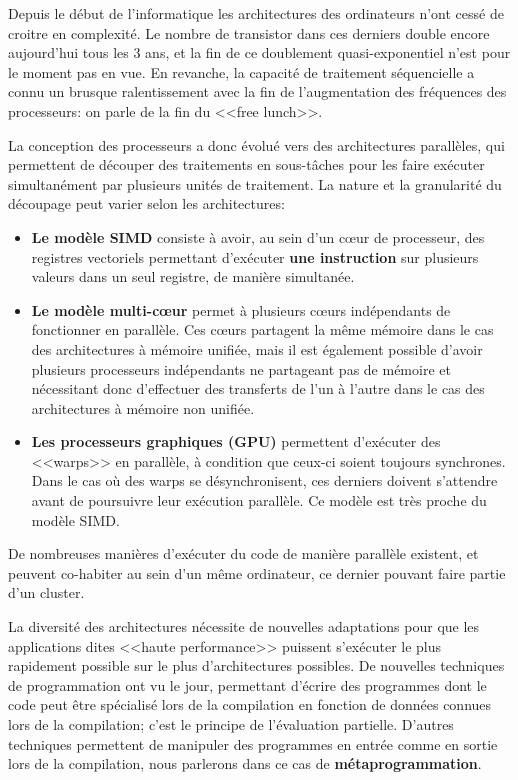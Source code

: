 \documentclass[main]{subfiles}
\begin{document}
Depuis le d\'ebut de l'informatique les architectures des ordinateurs n'ont
cess\'e de croitre en complexit\'e. Le nombre de transistor dans ces derniers
double encore aujourd'hui tous les 3 ans, et la fin de ce doublement
quasi-exponentiel n'est pour le moment pas en vue.
En revanche, la capacit\'e de traitement s\'equencielle a connu un brusque
ralentissement avec la fin de l'augmentation des fr\'equences des processeurs:
on parle de la fin du <<free lunch>>.

La conception des processeurs a donc \'evolu\'e vers des architectures
parall\`eles, qui permettent de d\'ecouper des traitements en sous-t\^aches
pour les faire ex\'ecuter simultan\'ement par plusieurs unit\'es de traitement.
La nature et la granularit\'e du d\'ecoupage peut varier selon les
architectures:

\begin{itemize}
\item
\textbf{Le mod\`ele SIMD} consiste \`a avoir, au sein d'un c\oe{}ur de
processeur, des registres vectoriels permettant d'ex\'ecuter
\textbf{une instruction} sur plusieurs valeurs dans un seul registre,
de mani\`ere simultan\'ee.

\item
\textbf{Le mod\`ele multi-c\oe{}ur} permet \`a plusieurs c\oe{}urs ind\'ependants de
fonctionner en parall\`ele. Ces c\oe{}urs partagent la m\^eme m\'emoire dans le
cas des architectures \`a m\'emoire unifi\'ee, mais il est \'egalement possible
d'avoir plusieurs processeurs ind\'ependants ne partageant pas de m\'emoire
et n\'ecessitant donc d'effectuer des transferts de l'un \`a l'autre dans le cas
des architectures \`a m\'emoire non unifi\'ee.

\item
\textbf{Les processeurs graphiques (GPU)} permettent d'ex\'ecuter des <<warps>> en
parall\`ele, \`a condition que ceux-ci soient toujours synchrones. Dans le cas
o\`u des warps se d\'esynchronisent, ces derniers doivent s'attendre avant de
poursuivre leur ex\'ecution parall\`ele. Ce mod\`ele est tr\`es proche
du mod\`ele SIMD.
\end{itemize}

De nombreuses mani\`eres d'ex\'ecuter du code de mani\`ere parall\`ele existent,
et peuvent co-habiter au sein d'un m\^eme ordinateur, ce dernier pouvant faire
partie d'un cluster.

La diversit\'e des architectures n\'ecessite de nouvelles adaptations pour que
les applications dites <<haute performance>> puissent s'ex\'ecuter
le plus rapidement possible sur le plus d'architectures possibles.
De nouvelles techniques de programmation ont vu le jour, permettant d'\'ecrire
des programmes dont le code peut \^etre sp\'ecialis\'e lors de la compilation
en fonction de donn\'ees connues lors de la compilation;
c'est le principe de l'\'evaluation partielle. D'autres techniques permettent
de manipuler des programmes en entr\'ee comme en sortie lors de la compilation,
nous parlerons dans ce cas de \textbf{m\'etaprogrammation}.
\end{document}
